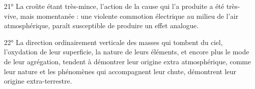 \documentclass[a4paper, 12pt, oneside, french]{article}
\begin{document}
21° La croûte étant très-mince, l'action de la cause qui l'a produite a été très-vive, mais momentanée : une violente commotion électrique au milieu de l'air atmosphérique, paraît susceptible de produire un effet analogue.

22° La direction ordinairement verticale des masses qui tombent du ciel, l'oxydation de leur superficie, la nature de leurs éléments, et encore plus le mode de leur agrégation, tendent à démontrer leur origine extra atmosphérique, comme leur nature et les phénomènes qui accompagnent leur chute, démontrent leur origine extra-terrestre.
\clearpage
\section{}
\subsection{}
\end{document}
